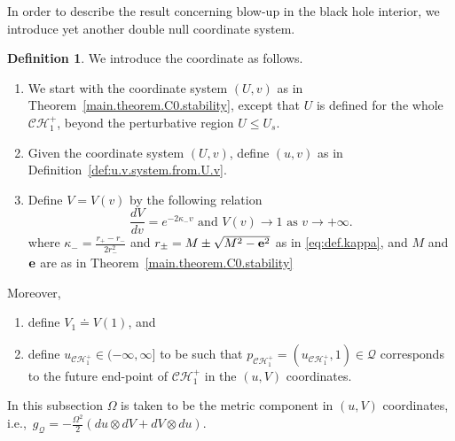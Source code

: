 \documentclass[10pt, reqno]{amsart}
\theoremstyle{definition}
\newtheorem{definition}[theorem]{Definition}
\theoremstyle{remark}
\numberwithin{equation}{section}
\newcommand{\0}{\emptyset}
\newcommand{\kpp}{\kappa}
\newcommand{\Omg}{\Omega}
\newcommand{\bfe}{{\bf e}}
\newcommand{\calC}{\mathcal C}
\newcommand{\calH}{\mathcal H}
\newcommand{\f}{\frac}
\newcommand{\CH}{\calC \calH^{+}}		%
\begin{document}
In order to describe the result concerning blow-up in the black hole interior, we introduce yet another double null coordinate system. 
\begin{definition}\label{def:uV}
We introduce the coordinate as follows. 
\begin{enumerate}
\item We start with the coordinate system $(U,v)$ as in Theorem~\ref{main.theorem.C0.stability}, except that $U$ is defined for the whole $\CH_1$, beyond the perturbative region $U\leq U_s$. 
\item Given the coordinate system $(U,v)$, define $(u,v)$ as in Definition~\ref{def:u.v.system.from.U.v}.
\item Define $V = V(v)$ by the following relation
\begin{equation}\label{V.CH.def.1}
\f{dV}{dv}=e^{-2\kappa_- v}\mbox{ and }V(v)\to 1\mbox{ as }v\to +\infty.
\end{equation}
where $\kpp_{-} = \frac{r_{+}-r_{-}}{2 r_{-}^{2}}$ and $r_{\pm} = M \pm \sqrt{M^{2}-\bfe^{2}}$ as in \eqref{eq:def.kappa}, and $M$ and $\bfe$ are as in Theorem~\ref{main.theorem.C0.stability}
\end{enumerate}
Moreover, 
\begin{enumerate}
\item define $V_1 \doteq V(1)$, and
\item define $u_{\CH_1} \in (-\infty,\infty]$ to be such that $p_{\CH_1} = (u_{\CH_1}, 1) \in \mathcal Q$ corresponds to the future end-point of $\CH_1$ in the $(u,V)$ coordinates.
\end{enumerate}
\end{definition}

In this subsection $\Omg$ is taken to be the metric component in $(u,V)$ coordinates, i.e.,~$g_{\mathcal Q} = -\f{\Omg^2}2 (du \otimes dV + dV \otimes du)$.
\end{document}

